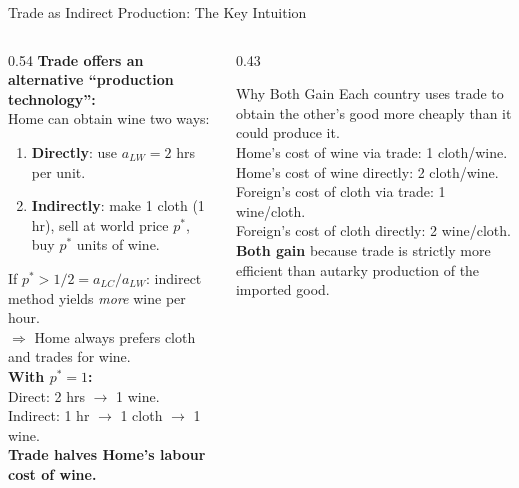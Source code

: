 \documentclass[aspectratio=169]{beamer}
\begin{document}
\begin{frame}[shrink=5]{Trade as Indirect Production: The Key Intuition}
\begin{columns}[T]
\begin{column}{0.54\textwidth}
\textbf{Trade offers an alternative ``production
technology'':}\\[0.3em]
Home can obtain wine two ways:
\begin{enumerate}\small
  \item \textbf{Directly}: use $a_{LW}=2$ hrs per unit.
  \item \textbf{Indirectly}: make 1 cloth (1 hr), sell at
        world price $p^{*}$, buy $p^{*}$ units of wine.
\end{enumerate}
\vspace{0.2em}
If $p^{*} > 1/2 = a_{LC}/a_{LW}$: indirect method
yields \emph{more} wine per hour.\\[0.2em]
$\Rightarrow$ Home always prefers cloth and trades for wine.\\[0.3em]
\textbf{With $p^{*}=1$:}\\
Direct: 2 hrs $\to$ 1 wine.\\
Indirect: 1 hr $\to$ 1 cloth $\to$ 1 wine.\\[0.1em]
\textbf{Trade halves Home's labour cost of wine.}
\end{column}
\begin{column}{0.43\textwidth}
\begin{insight}{Why Both Gain}
\small Each country uses trade to obtain the other's
good more cheaply than it could produce it.\\[0.3em]
Home's cost of wine via trade: 1 cloth/wine.\\
Home's cost of wine directly: 2 cloth/wine.\\[0.2em]
Foreign's cost of cloth via trade: 1 wine/cloth.\\
Foreign's cost of cloth directly: 2 wine/cloth.\\[0.3em]
\textbf{Both gain} because trade is strictly more
efficient than autarky production of the imported good.
\end{insight}
\end{column}
\end{columns}
\end{frame}
\end{document}

